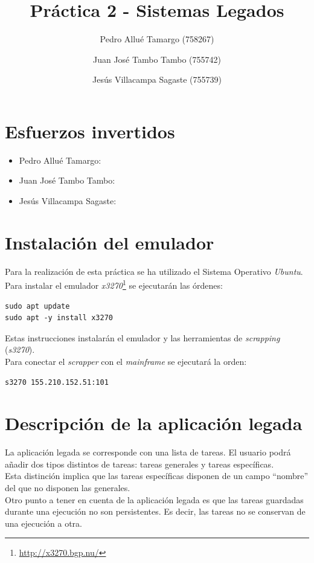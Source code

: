 \documentclass[10pt,a4paper]{article}
\begin{document}
\begin{titlepage}
\title{\textbf{{\Huge Práctica 2 - Sistemas Legados}}}
\author{
	Pedro Allué Tamargo (758267)
	\and
	Juan José Tambo Tambo (755742)
	\and
	Jesús Villacampa Sagaste (755739)
}
\clearpage\maketitle
\thispagestyle{empty}
\tableofcontents
\end{titlepage}

\section{Esfuerzos invertidos}

\begin{itemize}
\item Pedro Allué Tamargo:
\item Juan José Tambo Tambo:
\item Jesús Villacampa Sagaste:
\end{itemize}

\section{Instalación del emulador}

Para la realización de esta práctica se ha utilizado el Sistema Operativo \emph{Ubuntu}. Para instalar el emulador \emph{x3270}\footnote{\url{http://x3270.bgp.nu/}} se ejecutarán las órdenes:

\begin{lstlisting}
sudo apt update
sudo apt -y install x3270
\end{lstlisting}

Estas instrucciones instalarán el emulador y las herramientas de \emph{scrapping} (\emph{s3270}).\\

Para conectar el \emph{scrapper} con el \emph{mainframe} se ejecutará la orden:

\begin{lstlisting}
s3270 155.210.152.51:101
\end{lstlisting}


\section{Descripción de la aplicación legada}

La aplicación legada se corresponde con una lista de tareas. El usuario podrá añadir dos tipos distintos de tareas: tareas generales y tareas específicas.\\
Esta distinción implica que las tareas específicas disponen de un campo ``nombre'' del que no disponen las generales.\\
Otro punto a tener en cuenta de la aplicación legada es que las tareas guardadas durante una ejecución no son persistentes. Es decir, las tareas no se conservan de una ejecución a otra.
\end{document}
